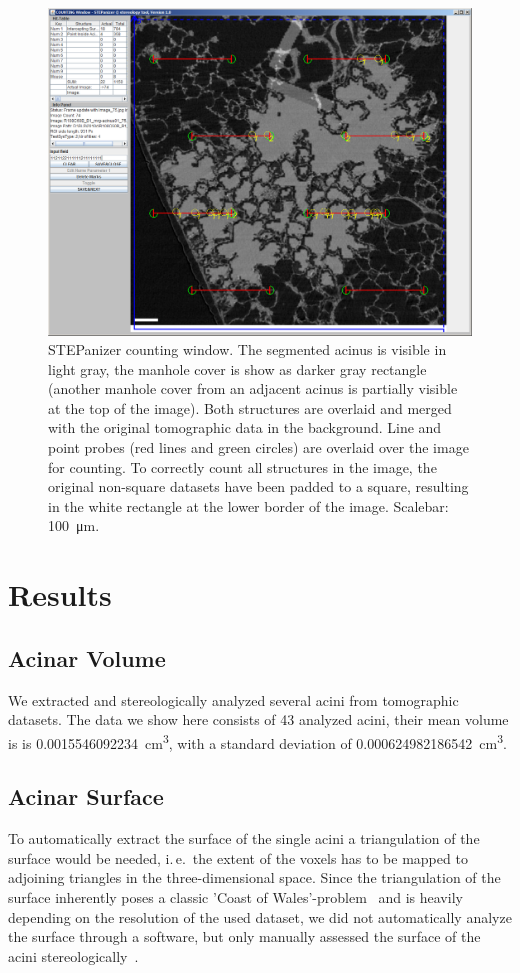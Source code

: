 \documentclass[%
	twoside,
	paper=a4,%
	abstract=true,%
	]{scrartcl}
\newcommand{\imsize}{\linewidth}
\newcommand{\ie}{i.\,e.\ }
\newcommand{\numberofacini}{43}
\newcommand{\volume}{0.0015546092234}
\newcommand{\std}{0.000624982186542}
\begin{document}
\renewcommand{\imsize}{\linewidth}%
\begin{figure}
	\centering
	\includegraphics[width=\imsize]{img/STEPanizer_2010_R108C60B_acinus01_Slice75}
	\caption{STEPanizer counting window. The segmented acinus is visible in light gray, the manhole cover is show as darker gray rectangle (another manhole cover from an adjacent acinus is partially visible at the top of the image). Both structures are overlaid and merged with the original tomographic data in the background. Line and point probes (red lines and green circles) are overlaid over the image for counting. To correctly count all structures in the image, the original non-square datasets have been padded to a square, resulting in the white rectangle at the lower border of the image. Scalebar: \SI{100}{\micro\meter}.}
	\label{fig:STEPanizer}
\end{figure}

\section{Results}
\subsection{Acinar Volume}
We extracted and stereologically analyzed several acini from tomographic datasets. The data we show here consists of \numberofacini\xspace analyzed acini, their mean volume is is \SI{\volume}{\centi\metre\cubed}, with a standard deviation of \SI{\std}{\centi\metre\cubed}.

\subsection{Acinar Surface}
To automatically extract the surface of the single acini a triangulation of the surface would be needed, \ie the extent of the voxels has to be mapped to adjoining triangles in the three-dimensional space. Since the triangulation of the surface inherently poses a classic 'Coast of Wales'-problem~\cite{Mandelbrot1967a} and is heavily depending on the resolution of the used dataset, we did not automatically analyze the surface through a software, but only manually assessed the surface of the acini stereologically~\cite{Hsia2010}.
\end{document}
